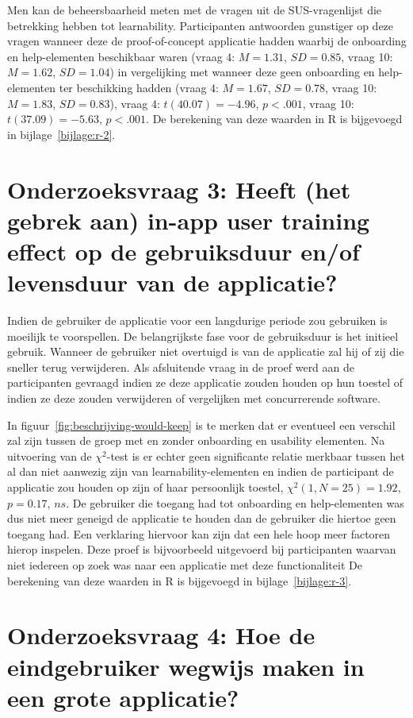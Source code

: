 Men kan de beheersbaarheid meten met de vragen uit de SUS-vragenlijst die betrekking hebben tot learnability. Participanten antwoorden gunstiger op deze vragen wanneer deze de proof-of-concept applicatie hadden waarbij de onboarding en help-elementen beschikbaar waren (vraag 4: $M = 1.31$, $SD = 0.85$, vraag 10: $M = 1.62$, $SD = 1.04$) in vergelijking met wanneer deze geen onboarding en help-elementen ter beschikking hadden (vraag 4: $M = 1.67$, $SD = 0.78$, vraag 10: $M = 1.83$, $SD = 0.83$), vraag 4: $t(40.07) = -4.96$, $p < .001$, vraag 10: $t(37.09) = -5.63$, $p < .001$. De berekening van deze waarden in R is bijgevoegd in bijlage~\ref{bijlage:r-2}.

\section[Onderzoeksvraag 3]{Onderzoeksvraag 3: Heeft (het gebrek aan) in-app user training effect op de gebruiksduur en/of levensduur van de applicatie?}
\label{sec:onderzoeksvraag-3}

Indien de gebruiker de applicatie voor een langdurige periode zou gebruiken is moeilijk te voorspellen. De belangrijkste fase voor de gebruiksduur is het initieel gebruik. Wanneer de gebruiker niet overtuigd is van de applicatie zal hij of zij die sneller terug verwijderen. Als afsluitende vraag in de proef werd aan de participanten gevraagd indien ze deze applicatie zouden houden op hun toestel of indien ze deze zouden verwijderen of vergelijken met concurrerende software.

In figuur~\ref{fig:beschrijving-would-keep} is te merken dat er eventueel een verschil zal zijn tussen de groep met en zonder onboarding en usability elementen. Na uitvoering van de $\chi^2$-test is er echter geen significante relatie merkbaar tussen het al dan niet aanwezig zijn van learnability-elementen en indien de participant de applicatie zou houden op zijn of haar persoonlijk toestel, $\chi^2 (1, N = 25) = 1.92$, $p = 0.17$, $ns$. De gebruiker die toegang had tot onboarding en help-elementen was dus niet meer geneigd de applicatie te houden dan de gebruiker die hiertoe geen toegang had. Een verklaring hiervoor kan zijn dat een hele hoop meer factoren hierop inspelen. Deze proef is bijvoorbeeld uitgevoerd bij participanten waarvan niet iedereen op zoek was naar een applicatie met deze functionaliteit De berekening van deze waarden in R is bijgevoegd in bijlage~\ref{bijlage:r-3}.

\section[Onderzoeksvraag 4]{Onderzoeksvraag 4: Hoe de eindgebruiker wegwijs maken in een grote applicatie?}
\label{sec:onderzoeksvraag-4}

